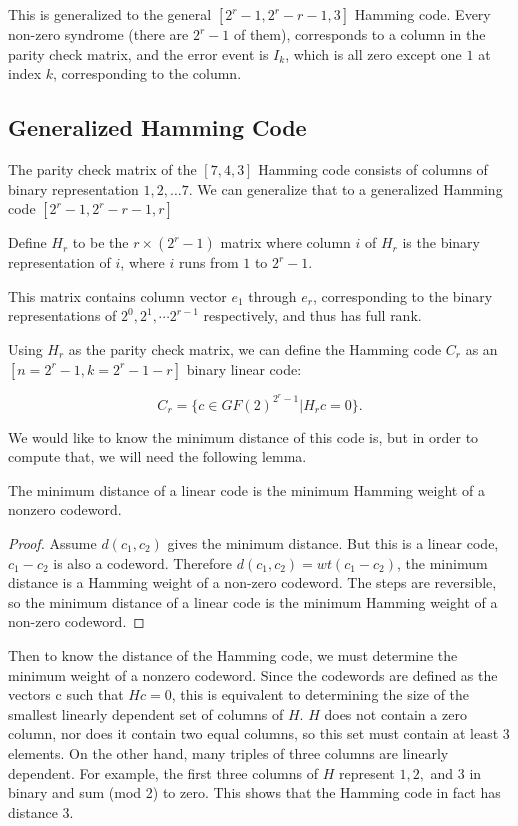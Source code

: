 This is generalized to the general \([2^r -1, 2^r - r-1, 3]\) Hamming code. Every non-zero syndrome (there are \(2^r - 1\) of them), corresponds to a column in the parity check matrix, and the error event is \(I_k\), which is all zero except one \(1\) at index \(k\), corresponding to the column. 


\subsection{Generalized Hamming Code}
The parity check matrix of the \([7, 4, 3]\) Hamming code consists of columns  of binary representation \(1, 2, \ldots 7.\) We can generalize that to a generalized Hamming code \([2^r - 1, 2^r - r -1, r]\)

Define \(H_r\) to be the \(r \times (2^r-1)\) matrix where column \(i\) of \(H_r\) is the binary representation of \(i\), where \(i\) runs from \(1\) to \(2^{r}-1\). 

This matrix contains column vector \(e_1\) through \(e_r\), corresponding to the binary representations of \(2^0, 2^1, \cdots 2^{r-1}\) respectively, and thus has full rank.

Using \(H_r\) as the parity check matrix, we can define the Hamming code 
\(C_r\) as an \([n=2^r-1, k=2^r - 1 -r]\) binary linear code:

\[C_r =\{ c \in GF(2)^{2^r-1} |H_r c= 0 \}. \]

We would like to know the minimum distance of this code is, but in order to compute that, we will need the following lemma.

\begin{lemma}
    The minimum distance of a linear code is the minimum Hamming weight of a nonzero codeword.
\end{lemma}

\begin{proof}
    Assume \(d(c_1, c_2)\) gives the minimum distance. But this is a linear code, \(c_1 - c_2\) is also a codeword. Therefore \(d(c_1, c_2) = wt(c_1 - c_2)\), the minimum distance is a Hamming weight of a non-zero codeword. The steps are reversible, so the minimum distance of a linear code is the minimum Hamming weight of a non-zero codeword.  
\end{proof} 

Then to know the distance of the Hamming code, we must determine the minimum weight of a nonzero codeword. Since the codewords are defined as the vectors c such that \(Hc = 0\), this is equivalent to determining the size of the smallest linearly dependent set of columns of \(H\). \(H\) does not contain a zero column, nor does it contain two equal columns, so this set must contain at least \(3\) elements. On the other hand, many triples of three columns are linearly dependent. For example, the first three columns of \(H\) represent \(1, 2,\) and \(3\) in binary and sum (mod 2) to zero. This shows that the Hamming code in fact has distance \(3\).

